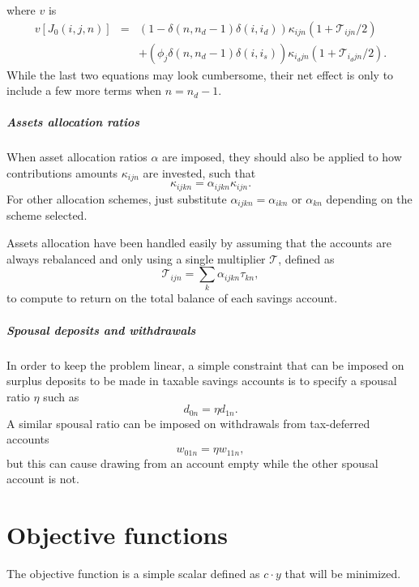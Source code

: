 \documentclass{report}[fleqn,11pt]
\begin{document}
where $v$ is
\begin{eqnarray}
	v[J_0(i, j, n)] 
	&=& (1 - \delta(n, n_d-1)\delta(i, i_d)) \kappa_{ijn}(1 + \mathcal{T}_{ijn}/2)
	\nonumber \\
	&& + (\phi_j\delta(n, n_d-1)\delta(i, i_s))\kappa_{i_djn}(1 + \mathcal{T}_{i_djn}/2). 
\end{eqnarray}
While the last two equations may look cumbersome, their net effect is only to include
a few more terms when $n=n_d-1$. 

\paragraph*{Assets allocation ratios}
When asset allocation ratios $\alpha$ are imposed,
they should also be applied to how
contributions amounts $\kappa_{ijn}$ are invested, such that 
\begin{equation}
	\kappa_{ijkn} = \alpha_{ijkn} \kappa_{ijn}.
\end{equation}
For other allocation schemes, just substitute $\alpha_{ijkn} = \alpha_{ikn}$ or $\alpha_{kn}$
depending on the scheme selected.

Assets allocation have been handled easily by assuming that
the accounts are always rebalanced
and only using a single multiplier $\mathcal{T}$, defined as
\begin{equation}
	\mathcal{T}_{ijn} = \sum_k \alpha_{ijkn}\tau_{kn},
\end{equation}
to compute to return
on the total balance of each savings account.

\paragraph*{Spousal deposits and withdrawals}
In order to keep the problem linear, a simple constraint that can be imposed on
surplus deposits to be made in taxable savings accounts is to specify a spousal ratio $\eta$
such as
\begin{equation}
	d_{0n} = \eta d_{1n}.
\end{equation}
A similar spousal ratio can be imposed on withdrawals from tax-deferred accounts
\begin{equation}
	w_{01n} = \eta w_{11n},
\end{equation}
but this can cause drawing from an account empty while the other spousal account is not.

\chapter{Objective functions}
The objective function is a simple scalar defined as $c\cdot y$ that will be minimized.
\end{document}
